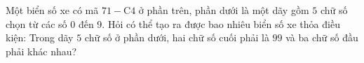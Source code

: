 \begin{bt}%
	Một biển số xe có mã $71-$C$4$ ở phần trên, phần dưới là một dãy gồm $5$ chữ số chọn từ các số $0$ đến $9$. Hỏi có thể tạo ra được bao nhiêu biển số xe thỏa điều kiện: Trong dãy $5$ chữ số ở phần dưới, hai chữ số cuối phải là $99$ và ba chữ số đầu phải khác nhau?
\end{bt}

